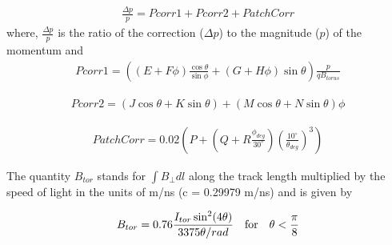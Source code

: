 \begin{eqnarray}
\label{eqPCor}
\frac{\Delta p}{p} = Pcorr1 + Pcorr2 + PatchCorr
\end{eqnarray}
where, $\frac{\Delta p}{p}$ is the ratio of the correction ($\Delta p$) to the magnitude ($p$) of the momentum and 
\begin{eqnarray}
\label{eqPCor1}
Pcorr1 = \left( (E+F\phi)\frac{\cos\theta}{\sin\phi} + (G+H\phi)\sin\theta   \right) \frac{p}{qB_{torus}} %
\end{eqnarray}


\begin{eqnarray}
\label{eqPCor2}
Pcorr2 = (J \cos\theta + K \sin\theta) + (M \cos\theta+N \sin\theta)\phi
\end{eqnarray}

\begin{eqnarray}
\label{eqPatchCor}
PatchCorr = 0.02\left(P + (Q + R\frac{\phi_{deg}}{30^\circ})(\frac{10^\circ}{\theta_{deg}})^3 \right) 
\end{eqnarray}

The quantity $B_{tor}$ stands for $\int{B_{\perp}dl}$ along the track length multiplied by the speed of light in the units 
of m/ns (c = 0.29979 m/ns) and is given by

\begin{eqnarray}
\label{eqBtor1}
B_{tor} = 0.76 \frac{I_{tor}\sin^2(4\theta)}{3375\theta/rad} \quad  \rm{for} \quad  \theta < \frac{\pi}{8} %
\end{eqnarray}

